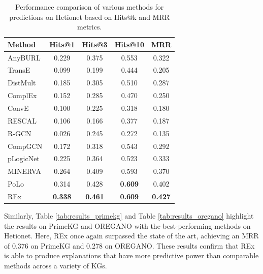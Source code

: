 \documentclass{article}
\theoremstyle{definition}
\begin{document}
\begin{table}[h!]
\centering
\begin{tabular}{lcccc}
\toprule
\textbf{Method} & \textbf{Hits@1} & \textbf{Hits@3} & \textbf{Hits@10} & \textbf{MRR} \\ \midrule
AnyBURL         & 0.229           & 0.375           & 0.553            & 0.322        \\ 
TransE          & 0.099           & 0.199           & 0.444            & 0.205        \\ 
DistMult        & 0.185           & 0.305           & 0.510            & 0.287        \\ 
ComplEx         & 0.152           & 0.285           & 0.470            & 0.250        \\ 
ConvE           & 0.100           & 0.225           & 0.318            & 0.180        \\ 
RESCAL          & 0.106           & 0.166           & 0.377            & 0.187        \\ 
R-GCN           & 0.026           & 0.245           & 0.272            & 0.135        \\ 
CompGCN         & 0.172           & 0.318           & 0.543            & 0.292        \\ 
pLogicNet       & 0.225           & 0.364           & 0.523            & 0.333        \\ \midrule 
MINERVA         & 0.264           & 0.409           & 0.593            & 0.370        \\ 
PoLo            & 0.314           & 0.428           & \textbf{0.609}            & 0.402        \\ 
REx & \textbf{0.338} & \textbf{0.461} & \textbf{0.609} & \textbf{0.427} \\

\bottomrule
\end{tabular}
\caption{Performance comparison of various methods for predictions on Hetionet based on Hits@k and MRR metrics.}
\label{tab:results_hetionet}
\end{table}

Similarly, Table \ref{tab:results_primekg} and Table \ref{tab:results_oregano} highlight the results on PrimeKG and OREGANO with the best-performing methods on Hetionet. Here, REx once again surpassed the state of the art, achieving an MRR of 0.376 on PrimeKG and 0.278 on OREGANO. These results confirm that REx is able to produce explanations that have more predictive power than comparable methods across a variety of KGs.
\end{document}
